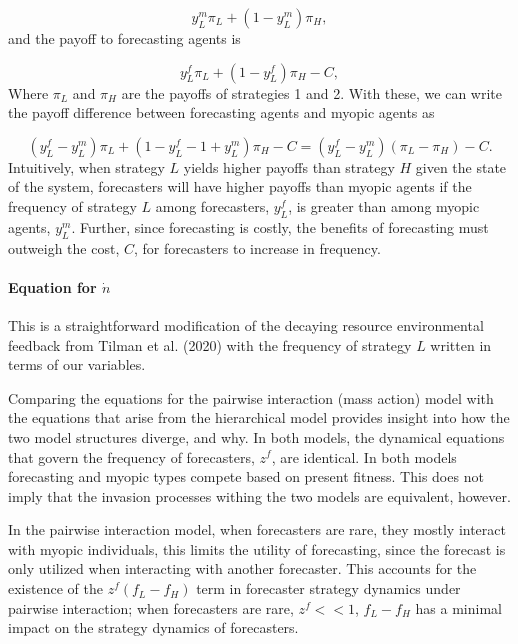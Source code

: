 \documentclass{article}
\begin{document}
\begin{equation}
    y_L^m\pi_L+(1-y_L^m)\pi_H,
\end{equation}
and the payoff to forecasting agents is

\begin{equation}
    y_L^f\pi_L+(1-y_L^f)\pi_H-C,
\end{equation}
Where $\pi_L$ and $\pi_H$ are the payoffs of strategies 1 and 2. With these, we can write the payoff difference between forecasting agents and myopic agents as

\begin{equation}
      (y_L^f-y_L^m)\pi_L+(1-y_L^f-1+y_L^m)\pi_H-C=(y_L^f-y_L^m)(\pi_L-\pi_H)-C.
\end{equation}
Intuitively, when strategy $L$ yields higher payoffs than strategy $H$ given the state of the system, forecasters will have higher payoffs than myopic agents if the frequency of strategy $L$ among forecasters, $y_L^f$, is greater than among myopic agents, $y_L^m$. Further, since forecasting is costly, the benefits of forecasting must outweigh the cost, $C$, for forecasters to increase in frequency. 

\paragraph{Equation for $\dot{n}$} This is a straightforward modification of the decaying resource environmental feedback from Tilman et al. (2020) with the frequency of strategy $L$ written in terms of our variables. 

\medskip
Comparing the equations for the pairwise interaction (mass action) model with the equations that arise from the hierarchical model provides insight into how the two model structures diverge, and why. In both models, the dynamical equations that govern the frequency of forecasters, $z^f$, are identical. In both models forecasting and myopic types compete based on present fitness. This does not imply that the invasion processes withing the two models are equivalent, however. 

In the pairwise interaction model, when forecasters are rare, they mostly interact with myopic individuals, this limits the utility of forecasting, since the forecast is only utilized when interacting with another forecaster. This accounts for the existence of the $z^f(f_L-f_H)$ term in forecaster strategy dynamics under pairwise interaction; when forecasters are rare, $z^f<<1$, $f_L-f_H$ has a minimal impact on the strategy dynamics of forecasters. 
\end{document}
